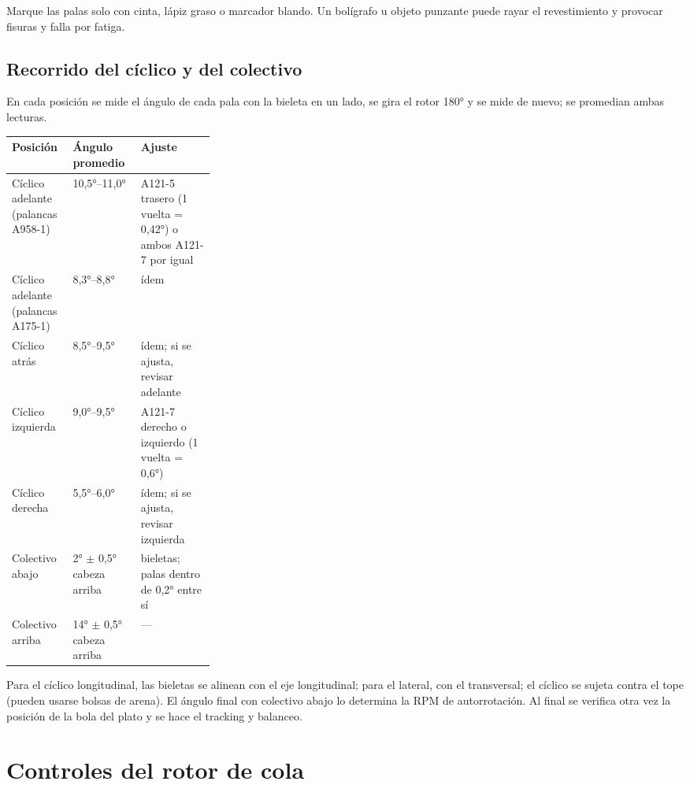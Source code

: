 \begin{advertencia}
Marque las palas solo con cinta, lápiz graso o marcador blando. Un bolígrafo u objeto punzante puede rayar el revestimiento y provocar fisuras y falla por fatiga.
\end{advertencia}

\subsection{Recorrido del cíclico y del colectivo}

En cada posición se mide el ángulo de cada pala con la bieleta en un lado, se gira el rotor 180° y se mide de nuevo; se promedian ambas lecturas.

\begin{center}
\small
\begin{tabularx}{\linewidth}{@{}>{\raggedright\arraybackslash}p{0.30\linewidth}l>{\raggedright\arraybackslash}X@{}}
\toprule
Posición & Ángulo promedio & Ajuste \\
\midrule
Cíclico adelante (palancas A958-1) & 10,5°--11,0° & A121-5 trasero (1 vuelta = 0,42°) o ambos A121-7 por igual \\
Cíclico adelante (palancas A175-1) & 8,3°--8,8° & ídem \\
Cíclico atrás & 8,5°--9,5° & ídem; si se ajusta, revisar adelante \\
Cíclico izquierda & 9,0°--9,5° & A121-7 derecho o izquierdo (1 vuelta = 0,6°) \\
Cíclico derecha & 5,5°--6,0° & ídem; si se ajusta, revisar izquierda \\
Colectivo abajo & 2° $\pm$ 0,5° cabeza arriba & bieletas; palas dentro de 0,2° entre sí \\
Colectivo arriba & 14° $\pm$ 0,5° cabeza arriba & --- \\
\bottomrule
\end{tabularx}
\end{center}

Para el cíclico longitudinal, las bieletas se alinean con el eje longitudinal; para el lateral, con el transversal; el cíclico se sujeta contra el tope (pueden usarse bolsas de arena). El ángulo final con colectivo abajo lo determina la RPM de autorrotación. Al final se verifica otra vez la posición de la bola del plato y se hace el tracking y balanceo.

\section{Controles del rotor de cola}

